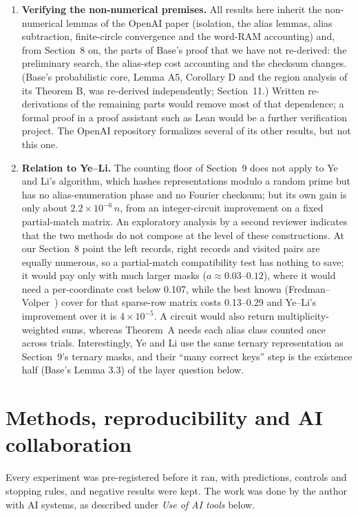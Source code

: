 \documentclass[11pt]{article}
\theoremstyle{plain}
\begin{document}
\begin{enumerate}
\item \textbf{Verifying the non-numerical premises.} All results here inherit the non-numerical lemmas of the OpenAI paper (isolation, the alias lemmas, alias subtraction, finite-circle convergence and the word-RAM accounting) and, from Section~8 on, the parts of Base's proof that we have not re-derived: the preliminary search, the alias-step cost accounting and the checksum changes. (Base's probabilistic core, Lemma A5, Corollary D and the region analysis of its Theorem B, was re-derived independently; Section~11.) Written re-derivations of the remaining parts would remove most of that dependence; a formal proof in a proof assistant such as Lean would be a further verification project. The OpenAI repository formalizes several of its other results, but not this one.
\item \textbf{Relation to Ye--Li.} The counting floor of Section~9 does not apply to Ye and Li's algorithm, which hashes representations modulo a random prime but has no alias-enumeration phase and no Fourier checksum; but its own gain is only about $2.2\times10^{-6}\, n$, from an integer-circuit improvement on a fixed partial-match matrix. An exploratory analysis by a second reviewer indicates that the two methods do not compose at the level of these constructions. At our Section~8 point the left records, right records and visited pairs are equally numerous, so a partial-match compatibility test has nothing to save; it would pay only with much larger masks ($a \approx 0.03$--$0.12$), where it would need a per-coordinate cost below 0.107, while the best known (Fredman--Volper~\cite{fv}) cover for that sparse-row matrix costs 0.13--0.29 and Ye--Li's improvement over it is $4\times10^{-5}$. A circuit would also return multiplicity-weighted sums, whereas Theorem~A needs each alias class counted once across trials. Interestingly, Ye and Li use the same ternary representation as Section~9's ternary masks, and their ``many correct keys'' step is the existence half (Base's Lemma 3.3) of the layer question below.
\end{enumerate}

\section{Methods, reproducibility and AI collaboration}

Every experiment was pre-registered before it ran, with predictions, controls and stopping rules, and negative results were kept. The work was done by the author with AI systems, as described under \emph{Use of AI tools} below.
\end{document}
